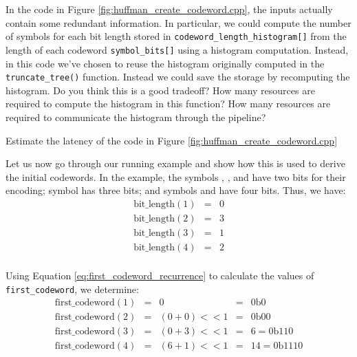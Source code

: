 \begin{exercise}
In the code in Figure \ref{fig:huffman_create_codeword.cpp}, the inputs actually contain some redundant information.  In particular, we could compute the number of symbols for each bit length stored in \lstinline{codeword_length_histogram[]} from the length of each codeword \lstinline{symbol_bits[]} using a histogram computation.  Instead, in this code we've chosen to reuse the histogram originally computed in the \lstinline{truncate_tree()} function.  Instead we could save the storage by recomputing the histogram.  Do you think this is a good tradeoff?   How many resources are required to compute the histogram in this function?  How many resources are required to communicate the histogram through the pipeline?
\end{exercise}

\begin{exercise}
Estimate the latency of the code in Figure \ref{fig:huffman_create_codeword.cpp}
\end{exercise}

Let us now go through our running example and show how this is used to derive the initial codewords. In the example, the symbols , , and  have two bits for their encoding; symbol  has three bits; and symbols  and  have four bits. Thus, we have:
\begin{equation}
\begin{array} {lcl} 
\mathrm{bit\_length}(1) & = & 0 \\
\mathrm{bit\_length}(2) & = & 3 \\
\mathrm{bit\_length}(3) & = & 1 \\
\mathrm{bit\_length}(4) & = & 2 \\
\end{array}
\label{eq:bit_lengths}
\end{equation}

Using Equation \ref{eq:first_codeword_recurrence} to calculate the values of \lstinline{first_codeword}, we determine:
\begin{equation}
\begin{array} {lllll} 
\mathrm{first\_codeword}(1) & = & 0 & = & \mathrm{0b0}\\
\mathrm{first\_codeword}(2) & = & (0 + 0) << 1 &=& \mathrm{0b00} \\
\mathrm{first\_codeword}(3) & = & (0 + 3) << 1 &=& 6 = \mathrm{0b110} \\
\mathrm{first\_codeword}(4) & = & (6 + 1) << 1 &=& 14 = \mathrm{0b1110} \\
\end{array}
\label{eq:symbols}
\end{equation}

